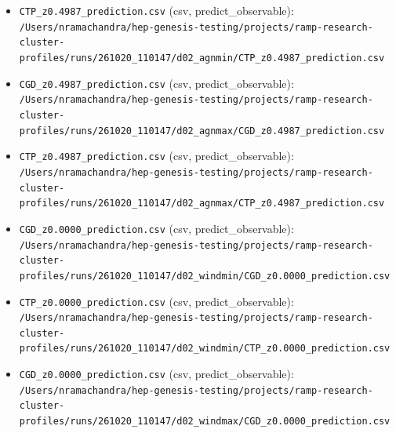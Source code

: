 \documentclass[11pt,a4paper]{article}
\begin{document}
\begin{itemize}
  \item \texttt{CTP\_\allowbreak{}z0.4987\_\allowbreak{}prediction.csv} (csv, predict\_observable): \texttt{/\allowbreak{}Users/\allowbreak{}nramachandra/\allowbreak{}hep-genesis-testing/\allowbreak{}projects/\allowbreak{}ramp-research-cluster-profiles/\allowbreak{}runs/\allowbreak{}261020\_\allowbreak{}110147/\allowbreak{}d02\_\allowbreak{}agnmin/\allowbreak{}CTP\_\allowbreak{}z0.4987\_\allowbreak{}prediction.csv}
  \item \texttt{CGD\_\allowbreak{}z0.4987\_\allowbreak{}prediction.csv} (csv, predict\_observable): \texttt{/\allowbreak{}Users/\allowbreak{}nramachandra/\allowbreak{}hep-genesis-testing/\allowbreak{}projects/\allowbreak{}ramp-research-cluster-profiles/\allowbreak{}runs/\allowbreak{}261020\_\allowbreak{}110147/\allowbreak{}d02\_\allowbreak{}agnmax/\allowbreak{}CGD\_\allowbreak{}z0.4987\_\allowbreak{}prediction.csv}
  \item \texttt{CTP\_\allowbreak{}z0.4987\_\allowbreak{}prediction.csv} (csv, predict\_observable): \texttt{/\allowbreak{}Users/\allowbreak{}nramachandra/\allowbreak{}hep-genesis-testing/\allowbreak{}projects/\allowbreak{}ramp-research-cluster-profiles/\allowbreak{}runs/\allowbreak{}261020\_\allowbreak{}110147/\allowbreak{}d02\_\allowbreak{}agnmax/\allowbreak{}CTP\_\allowbreak{}z0.4987\_\allowbreak{}prediction.csv}
  \item \texttt{CGD\_\allowbreak{}z0.0000\_\allowbreak{}prediction.csv} (csv, predict\_observable): \texttt{/\allowbreak{}Users/\allowbreak{}nramachandra/\allowbreak{}hep-genesis-testing/\allowbreak{}projects/\allowbreak{}ramp-research-cluster-profiles/\allowbreak{}runs/\allowbreak{}261020\_\allowbreak{}110147/\allowbreak{}d02\_\allowbreak{}windmin/\allowbreak{}CGD\_\allowbreak{}z0.0000\_\allowbreak{}prediction.csv}
  \item \texttt{CTP\_\allowbreak{}z0.0000\_\allowbreak{}prediction.csv} (csv, predict\_observable): \texttt{/\allowbreak{}Users/\allowbreak{}nramachandra/\allowbreak{}hep-genesis-testing/\allowbreak{}projects/\allowbreak{}ramp-research-cluster-profiles/\allowbreak{}runs/\allowbreak{}261020\_\allowbreak{}110147/\allowbreak{}d02\_\allowbreak{}windmin/\allowbreak{}CTP\_\allowbreak{}z0.0000\_\allowbreak{}prediction.csv}
  \item \texttt{CGD\_\allowbreak{}z0.0000\_\allowbreak{}prediction.csv} (csv, predict\_observable): \texttt{/\allowbreak{}Users/\allowbreak{}nramachandra/\allowbreak{}hep-genesis-testing/\allowbreak{}projects/\allowbreak{}ramp-research-cluster-profiles/\allowbreak{}runs/\allowbreak{}261020\_\allowbreak{}110147/\allowbreak{}d02\_\allowbreak{}windmax/\allowbreak{}CGD\_\allowbreak{}z0.0000\_\allowbreak{}prediction.csv}

\end{itemize}
\end{document}
